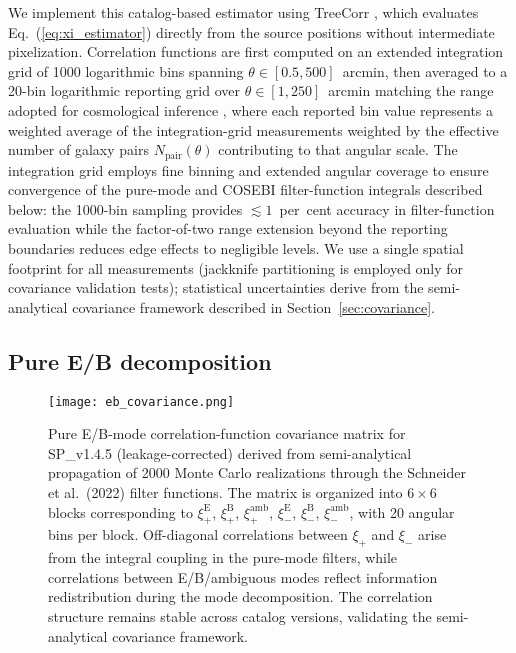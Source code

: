\documentclass{aa}
\begin{document}
We implement this catalog-based estimator using TreeCorr \citep{jarvis15}, which evaluates Eq.~(\ref{eq:xi_estimator}) directly from the source positions without intermediate pixelization. Correlation functions are first computed on an extended integration grid of 1000 logarithmic bins spanning $\theta \in [0.5, 500]$~arcmin, then averaged to a 20-bin logarithmic reporting grid over $\theta \in [1, 250]$~arcmin matching the range adopted for cosmological inference \citep{goh.etal25}, where each reported bin value represents a weighted average of the integration-grid measurements weighted by the effective number of galaxy pairs $N_{\mathrm{pair}}(\theta)$ contributing to that angular scale. The integration grid employs fine binning and extended angular coverage to ensure convergence of the pure-mode and COSEBI filter-function integrals described below: the 1000-bin sampling provides $\lesssim 1$~per~cent accuracy in filter-function evaluation while the factor-of-two range extension beyond the reporting boundaries reduces edge effects to negligible levels. We use a single spatial footprint for all measurements (jackknife partitioning is employed only for covariance validation tests); statistical uncertainties derive from the semi-analytical covariance framework described in Section~\ref{sec:covariance}.

\subsection{Pure E/B decomposition}
\label{sec:pure_eb}

\begin{figure}[htb]
\centering
\texttt{[image: eb\_covariance.png]}
\caption{Pure E/B-mode correlation-function covariance matrix for SP\_v1.4.5 (leakage-corrected) derived from semi-analytical propagation of 2000 Monte Carlo realizations through the Schneider et al.\ (2022) filter functions. The matrix is organized into $6 \times 6$ blocks corresponding to $\xi_+^{\mathrm{E}}$, $\xi_+^{\mathrm{B}}$, $\xi_+^{\mathrm{amb}}$, $\xi_-^{\mathrm{E}}$, $\xi_-^{\mathrm{B}}$, $\xi_-^{\mathrm{amb}}$, with 20 angular bins per block. Off-diagonal correlations between $\xi_+$ and $\xi_-$ arise from the integral coupling in the pure-mode filters, while correlations between E/B/ambiguous modes reflect information redistribution during the mode decomposition. The correlation structure remains stable across catalog versions, validating the semi-analytical covariance framework.}
\label{fig:eb_covariance}
\end{figure}
\end{document}
